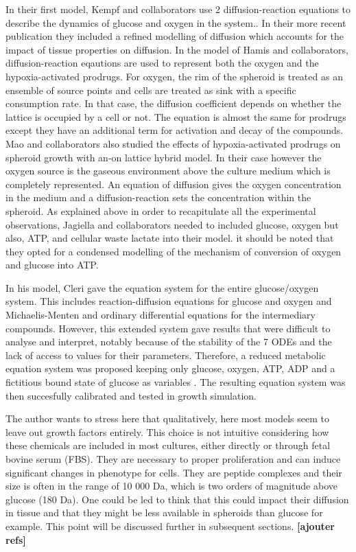 \documentclass[11pt,a4paper]{article}
\begin{document}
In their first model, Kempf and collaborators use 2 diffusion-reaction equations to describe the dynamics of glucose and oxygen in the system.\cite{Kempf2005}. In their more recent publication they included a refined modelling of diffusion which accounts for the impact of tissue properties  on diffusion.\cite{Kempf2015} In the model of Hamis and collaborators, diffusion-reaction eqautions are used to represent both the oxygen and the hypoxia-activated prodrugs.\cite{Hamis2020} For oxygen, the rim of the spheroid is treated as an ensemble of source points and cells are treated as sink with a specific consumption rate. In that case, the diffusion coefficient depends on whether the lattice is occupied by a cell or not. The equation is almost the same for prodrugs except they have an additional term for activation and decay of the compounds. Mao and collaborators also studied the effects of hypoxia-activated prodrugs on spheroid growth with an-on lattice hybrid model. In their case however the oxygen source is the gaseous environment above the culture medium which is completely represented. An equation of diffusion gives the oxygen concentration in the medium and a diffusion-reaction sets the concentration within the spheroid. As explained above in order to recapitulate all the experimental observations, Jagiella and collaborators needed to included glucose, oxygen but also, ATP, and cellular waste lactate into their model.\cite{Jagiella2016} it should be noted that they opted for a condensed modelling of the mechanism of conversion of oxygen and glucose into ATP.

In his model, Cleri gave the equation system for the entire glucose/oxygen system.\cite{Cleri2019} This includes reaction-diffusion equations for glucose and oxygen and Michaelis-Menten and ordinary differential equations for the intermediary compounds. However, this extended system gave results that were difficult to analyse and interpret, notably because of the stability of the 7 ODEs and the lack of access to values for their parameters. Therefore, a reduced metabolic equation system was proposed keeping only glucose, oxygen, ATP, ADP and a fictitious bound state of glucose as variables . The resulting equation system was then succesfully calibrated and tested in growth simulation. 

The author wants to stress here that qualitatively, here most models seem to leave out growth factors entirely.  This choice is not intuitive considering how these chemicals are included in most cultures, either directly or through fetal bovine serum (FBS). They are necessary to proper proliferation and can induce significant changes in phenotype for cells. They are peptide complexes and their size is often in the range of 10 000 Da, which is two orders of magnitude above glucose (180 Da). One could be led to think that this could impact their diffusion in tissue and that they might be less available in spheroids than glucose for example. This point will be discussed further in subsequent sections. \textbf{[ajouter refs]}
\end{document}
